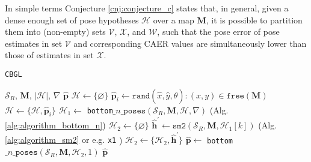 In simple terms Conjecture \ref{cnj:conjecture_c} states that, in general,
given a dense enough set of pose hypotheses $\mathcal{H}$ over a map $\bm{M}$,
it is possible to partition them into (non-empty) sets $\mathcal{V}$,
$\mathcal{X}$, and $\mathcal{W}$, such that the pose error of pose estimates in
set $\mathcal{V}$ and corresponding CAER values %
are simultaneously lower than those of estimates in set $\mathcal{X}$.


\begin{figure}
  
  \vspace{1cm}
  \caption{\small }
  \label{fig:h_fig1}
\end{figure}

\begin{figure}[]\centering
  
  \caption{\small }
  \label{fig:cbgl}
\end{figure}

\begin{figure}[]\centering
  
  \caption{\small }
  \label{fig:cbgl}
\end{figure}





\begin{algorithm}
  \caption{\texttt{CBGL}}
  \begin{spacing}{1.2}
  \begin{algorithmic}[1]
    \REQUIRE $\mathcal{S}_R$, $\bm{M}$, $|\mathcal{H}|$, $\nabla$
    \ENSURE $\hat{\bm{p}}$
    \STATE $\mathcal{H} \leftarrow \{\varnothing\}$
      \STATE $\hat{\bm{p}}_i \leftarrow \texttt{rand}(\hat{x},\hat{y},\hat{\theta}): (x,y) \in \texttt{free}(\bm{M})$
      \STATE $\mathcal{H} \leftarrow \{\mathcal{H}, \hat{\bm{p}}_i\}$
    \ENDFOR
    \STATE $\mathcal{H}_1 \leftarrow$ \texttt{bottom}$\_n\_\texttt{poses}(\mathcal{S}_R, \bm{M}, \mathcal{H}, \nabla)$ \hfill {\small (Alg. \ref{alg:algorithm_bottom_n}})
    \STATE $\mathcal{H}_2 \leftarrow \{\varnothing \}$
      \STATE $\hat{\bm{h}}^\prime \leftarrow \texttt{sm2}(\mathcal{S}_R, \bm{M}, \mathcal{H}_1[k])$ \hfill {\small (Alg. \ref{alg:algorithm_sm2} or e.g. \texttt{x1} \cite{FILOTHEOU2023100288}})
      \STATE $\mathcal{H}_2 \leftarrow \{\mathcal{H}_2, \hat{\bm{h}}^\prime\}$
    \ENDFOR
    \STATE $\hat{\bm{p}} \leftarrow$ \texttt{bottom}$\_n\_\texttt{poses}(\mathcal{S}_R, \bm{M}, \mathcal{H}_2, 1)$
    \RETURN $\hat{\bm{p}}$
  \end{algorithmic}
  \end{spacing}
  \label{alg:algorithm_cbgl}
\end{algorithm}

